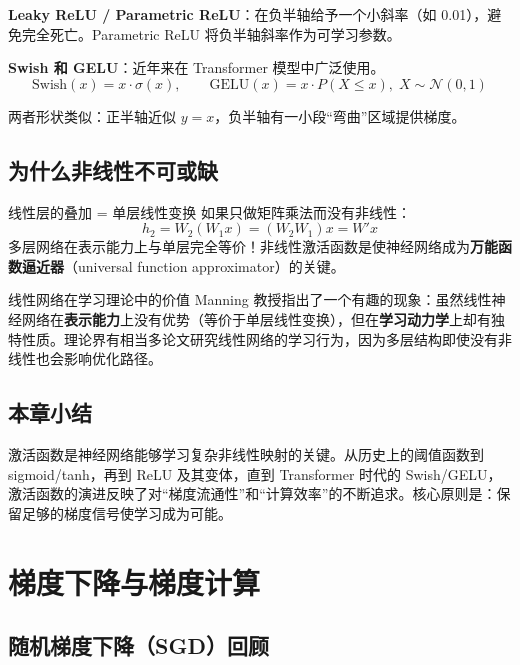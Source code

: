 \documentclass[a4paper]{article}
\begin{document}
\textbf{Leaky ReLU / Parametric ReLU}：在负半轴给予一个小斜率（如 0.01），避免完全死亡。Parametric ReLU 将负半轴斜率作为可学习参数。

\textbf{Swish 和 GELU}：近年来在 Transformer 模型中广泛使用。
$$\text{Swish}(x) = x \cdot \sigma(x), \qquad \text{GELU}(x) = x \cdot P(X \le x), \; X \sim \mathcal{N}(0,1)$$

两者形状类似：正半轴近似 $y = x$，负半轴有一小段``弯曲''区域提供梯度。

\subsection{为什么非线性不可或缺}





\begin{importantbox}{线性层的叠加 = 单层线性变换}
如果只做矩阵乘法而没有非线性：
$$h_2 = W_2(W_1 x) = (W_2 W_1) x = W'x$$
多层网络在表示能力上与单层完全等价！非线性激活函数是使神经网络成为\textbf{万能函数逼近器}（universal function approximator）的关键。
\end{importantbox}

\begin{knowledgebox}{线性网络在学习理论中的价值}
Manning 教授指出了一个有趣的现象：虽然线性神经网络在\textbf{表示能力}上没有优势（等价于单层线性变换），但在\textbf{学习动力学}上却有独特性质。理论界有相当多论文研究线性网络的学习行为，因为多层结构即使没有非线性也会影响优化路径。
\end{knowledgebox}

\subsection{本章小结}

激活函数是神经网络能够学习复杂非线性映射的关键。从历史上的阈值函数到 sigmoid/tanh，再到 ReLU 及其变体，直到 Transformer 时代的 Swish/GELU，激活函数的演进反映了对``梯度流通性''和``计算效率''的不断追求。核心原则是：保留足够的梯度信号使学习成为可能。


\section{梯度下降与梯度计算}

\subsection{随机梯度下降（SGD）回顾}
\end{document}

